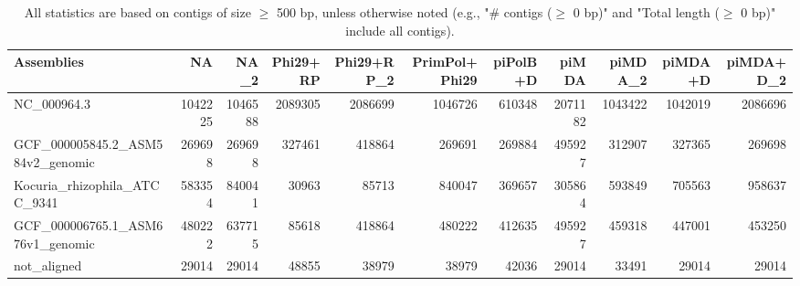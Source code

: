 \documentclass[12pt,a4paper]{article}
\begin{document}
\begin{table}[ht]
\begin{center}
\caption{All statistics are based on contigs of size $\geq$ 500 bp, unless otherwise noted (e.g., "\# contigs ($\geq$ 0 bp)" and "Total length ($\geq$ 0 bp)" include all contigs).}
\begin{tabular}{|l*{10}{|r}|}
\hline
Assemblies & NA & NA\_2 & Phi29+RP & Phi29+RP\_2 & PrimPol+Phi29 & piPolB+D & piMDA & piMDA\_2 & piMDA+D & piMDA+D\_2 \\ \hline
NC\_000964.3 & 1042225 & 1046588 & 2089305 & 2086699 & 1046726 & 610348 & 2071182 & 1043422 & 1042019 & 2086696 \\ \hline
GCF\_000005845.2\_ASM584v2\_genomic & 269698 & 269698 & 327461 & 418864 & 269691 & 269884 & 495927 & 312907 & 327365 & 269698 \\ \hline
Kocuria\_rhizophila\_ATCC\_9341 & 583354 & 840041 & 30963 & 85713 & 840047 & 369657 & 305864 & 593849 & 705563 & 958637 \\ \hline
GCF\_000006765.1\_ASM676v1\_genomic & 480222 & 637715 & 85618 & 418864 & 480222 & 412635 & 495927 & 459318 & 447001 & 453250 \\ \hline
not\_aligned & 29014 & 29014 & 48855 & 38979 & 38979 & 42036 & 29014 & 33491 & 29014 & 29014 \\ \hline
\end{tabular}
\end{center}
\end{table}
\end{document}
